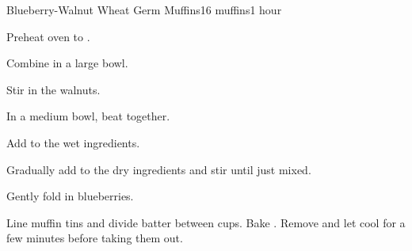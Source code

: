 \documentclass[../Cookbook.tex]{subfiles}
\begin{document}
\begin{recipe}{Blueberry-Walnut Wheat Germ Muffins}{16 muffins}{1 hour}

Preheat oven to .

Combine in a large bowl.

Stir in the walnuts.

In a medium bowl, beat together.

Add to the wet ingredients.

Gradually add to the dry ingredients and stir until just mixed.

Gently fold in blueberries.

Line muffin tins and divide batter between cups. Bake . Remove and let cool for a few minutes before taking them out.


\end{recipe}
\end{document}
